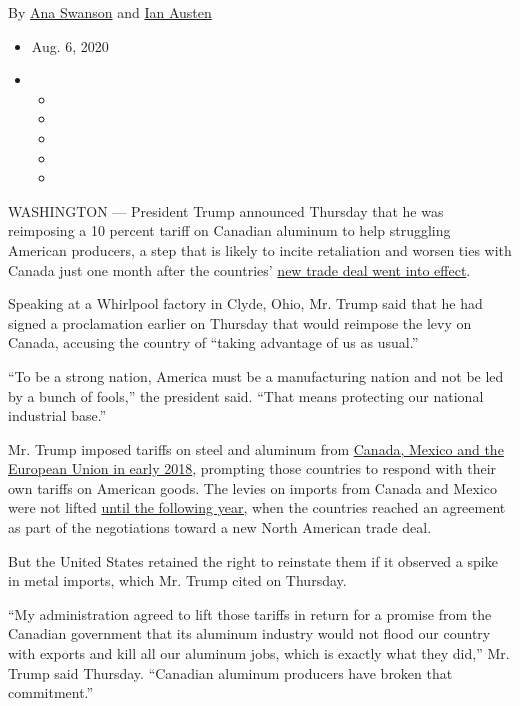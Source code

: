 By \href{https://www.nytimes3xbfgragh.onion/by/ana-swanson}{Ana Swanson}
and \href{https://www.nytimes3xbfgragh.onion/by/ian-austen}{Ian Austen}

\begin{itemize}
\item
  Aug. 6, 2020
\item
  \begin{itemize}
  \item
  \item
  \item
  \item
  \item
  \end{itemize}
\end{itemize}

WASHINGTON --- President Trump announced Thursday that he was reimposing
a 10 percent tariff on Canadian aluminum to help struggling American
producers, a step that is likely to incite retaliation and worsen ties
with Canada just one month after the countries'
\href{https://www.nytimes3xbfgragh.onion/2020/07/01/business/economy/usmca-takes-effect.html}{new
trade deal went into effect}.

Speaking at a Whirlpool factory in Clyde, Ohio, Mr. Trump said that he
had signed a proclamation earlier on Thursday that would reimpose the
levy on Canada, accusing the country of ``taking advantage of us as
usual.''

``To be a strong nation, America must be a manufacturing nation and not
be led by a bunch of fools,'' the president said. ``That means
protecting our national industrial base.''

Mr. Trump imposed tariffs on steel and aluminum from
\href{https://www.nytimes3xbfgragh.onion/2018/05/31/us/politics/trump-aluminum-steel-tariffs.html}{Canada,
Mexico and the European Union in early 2018}, prompting those countries
to respond with their own tariffs on American goods. The levies on
imports from Canada and Mexico were not lifted
\href{https://www.nytimes3xbfgragh.onion/2019/05/17/us/politics/china-auto-tariffs-donald-trump.html}{until
the following year,} when the countries reached an agreement as part of
the negotiations toward a new North American trade deal.

But the United States retained the right to reinstate them if it
observed a spike in metal imports, which Mr. Trump cited on Thursday.

``My administration agreed to lift those tariffs in return for a promise
from the Canadian government that its aluminum industry would not flood
our country with exports and kill all our aluminum jobs, which is
exactly what they did,'' Mr. Trump said Thursday. ``Canadian aluminum
producers have broken that commitment.''

